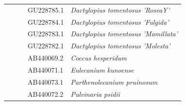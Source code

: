 \begin{landscape}
\begin{table}[H]
{\begin{tabular}{@{}lllll@{}}
 &  &  & GU228785.1 & \textit{Dactylopius tomentosus 'RoseaY'} \\
 &  &  & GU228784.1 & \textit{Dactylopius tomentosus 'Fulgida'} \\
 &  &  & GU228783.1 & \textit{Dactylopius tomentosus 'Mamillata'} \\
 &  &  & GU228782.1 & \textit{Dactylopius tomentosus 'Molesta'} \\
 &  &  & AB440069.2 & \textit{Coccus hesperidum} \\
 &  &  & AB440071.1 & \textit{Eulecanium kunoense} \\
 &  &  & AB440073.1 & \textit{Parthenolecanium pruinosum} \\
 &  &  & AB440072.2 & \textit{Pulvinaria psidii} \\ \bottomrule
\end{tabular}
}%
\end{table}


\end{landscape}
